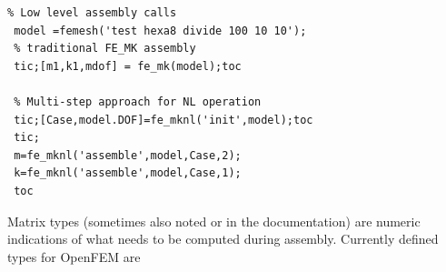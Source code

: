 \begin{verbatim}
% Low level assembly calls
 model =femesh('test hexa8 divide 100 10 10');
 % traditional FE_MK assembly
 tic;[m1,k1,mdof] = fe_mk(model);toc

 % Multi-step approach for NL operation
 tic;[Case,model.DOF]=fe_mknl('init',model);toc
 tic;
 m=fe_mknl('assemble',model,Case,2);
 k=fe_mknl('assemble',model,Case,1);
 toc
\end{verbatim}%



Matrix types (sometimes also noted  or  in the documentation) are numeric indications of what needs to be computed during assembly. Currently defined types for OpenFEM are

